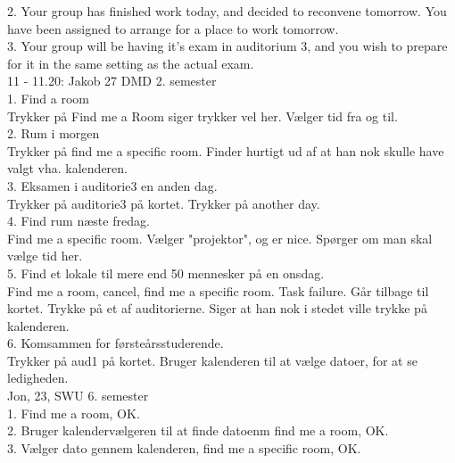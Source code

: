 2.
Your group has finished work today, and decided to reconvene tomorrow. You have been assigned to arrange for a place to work tomorrow.\\

3.
Your group will be having it's exam in auditorium 3, and you wish to prepare for it in the same setting as the actual exam. \\


11 - 11.20:	Jakob 27 DMD 2. semester\\



1. Find a room\\
Trykker på Find me a Room \- siger trykker vel her.
Vælger tid fra og til.\\


2. Rum i morgen\\
Trykker på find me a specific room. Finder hurtigt ud af at han nok skulle have valgt vha. kalenderen.\\


3. Eksamen i auditorie3 en anden dag.\\
Trykker på auditorie3 på kortet. Trykker på another day. \\


4. Find rum næste fredag.\\
Find me a specific room. Vælger "projektor", og er nice. Spørger om man skal vælge tid her.\\

5. Find et lokale til mere end 50 mennesker på en onsdag.\\
Find me a room, cancel, find me a specific room. Task failure. Går tilbage til kortet. Trykke på et af auditorierne. Siger at han nok i stedet ville trykke på kalenderen. \\


6. Komsammen for førsteårsstuderende.\\
Trykker på aud1 på kortet. Bruger kalenderen til at vælge datoer, for at se ledigheden.\\




Jon, 23, SWU 6. semester\\

1.
Find me a room, OK. \\


2.
Bruger kalendervælgeren til at finde datoenm find me a room, OK.\\


3.
Vælger dato gennem kalenderen, find me a specific room, OK.\\


